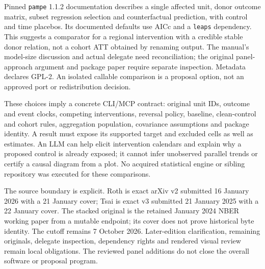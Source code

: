 Pinned \texttt{pampe} 1.1.2 documentation describes a single affected unit, donor outcome matrix, subset regression selection
and counterfactual prediction, with control and time placebos. Its documented defaults use AICc and a \texttt{leaps}
dependency. This suggests a comparator for a regional intervention with a credible stable donor relation, not a cohort ATT
obtained by renaming output. The manual's model-size discussion and actual delegate need reconciliation; the original
panel-approach argument and package paper require separate inspection. Metadata declares GPL-2. An isolated callable
comparison is a proposal option, not an approved port or redistribution decision.~\citep{exec28_panel_software}

These choices imply a concrete CLI/MCP contract: original unit IDs, outcome and event clocks, competing interventions,
reversal policy, baseline, clean-control and cohort rules, aggregation population, covariance assumptions and package identity.
A result must expose its supported target and excluded cells as well as estimates. An LLM can help elicit intervention
calendars and explain why a proposed control is already exposed; it cannot infer unobserved parallel trends or certify a
causal diagram from a plot. No acquired statistical engine or sibling repository was executed for these comparisons.

The source boundary is explicit. Roth is exact arXiv v2 submitted 16 January 2026 with a 21 January cover; Tsai is exact
v3 submitted 21 January 2025 with a 22 January cover. The stacked original is the retained January 2024 NBER working paper
from a mutable endpoint; its cover does not prove historical byte identity. The cutoff remains 7 October 2026.
Later-edition clarification, remaining originals, delegate inspection, dependency rights and rendered visual review remain
local obligations. The reviewed panel additions do not close the overall software or proposal program.
